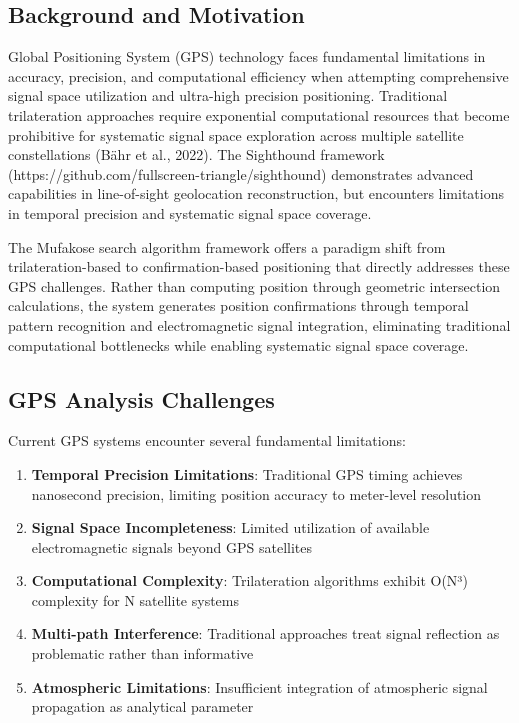 \documentclass[12pt,a4paper]{article}
\begin{document}
\subsection{Background and Motivation}

Global Positioning System (GPS) technology faces fundamental limitations in accuracy, precision, and computational efficiency when attempting comprehensive signal space utilization and ultra-high precision positioning. Traditional trilateration approaches require exponential computational resources that become prohibitive for systematic signal space exploration across multiple satellite constellations (Bähr et al., 2022). The Sighthound framework (https://github.com/fullscreen-triangle/sighthound) demonstrates advanced capabilities in line-of-sight geolocation reconstruction, but encounters limitations in temporal precision and systematic signal space coverage.

The Mufakose search algorithm framework offers a paradigm shift from trilateration-based to confirmation-based positioning that directly addresses these GPS challenges. Rather than computing position through geometric intersection calculations, the system generates position confirmations through temporal pattern recognition and electromagnetic signal integration, eliminating traditional computational bottlenecks while enabling systematic signal space coverage.

\subsection{GPS Analysis Challenges}

Current GPS systems encounter several fundamental limitations:

\begin{enumerate}
\item \textbf{Temporal Precision Limitations}: Traditional GPS timing achieves nanosecond precision, limiting position accuracy to meter-level resolution
\item \textbf{Signal Space Incompleteness}: Limited utilization of available electromagnetic signals beyond GPS satellites
\item \textbf{Computational Complexity}: Trilateration algorithms exhibit O(N³) complexity for N satellite systems
\item \textbf{Multi-path Interference}: Traditional approaches treat signal reflection as problematic rather than informative
\item \textbf{Atmospheric Limitations}: Insufficient integration of atmospheric signal propagation as analytical parameter
\end{enumerate}
\end{document}
